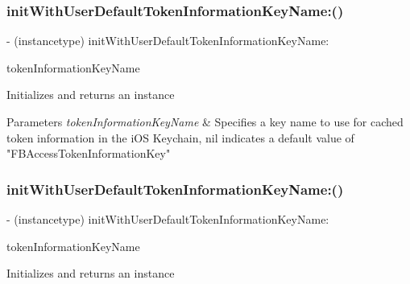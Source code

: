 \subsubsection{\texorpdfstring{init\+With\+User\+Default\+Token\+Information\+Key\+Name\+:()}{initWithUserDefaultTokenInformationKeyName:()}\hspace{0.1cm}{\footnotesize\ttfamily [3/5]}}
{\footnotesize\ttfamily -\/ (instancetype) init\+With\+User\+Default\+Token\+Information\+Key\+Name\+: \begin{DoxyParamCaption}\item[{(N\+S\+String $\ast$)}]{token\+Information\+Key\+Name }\end{DoxyParamCaption}}

Initializes and returns an instance


\begin{DoxyParams}{Parameters}
{\em token\+Information\+Key\+Name} & Specifies a key name to use for cached token information in the i\+OS Keychain, nil indicates a default value of "F\+B\+Access\+Token\+Information\+Key" \\
\hline
\end{DoxyParams}
\mbox{\label{interfaceFBSessionTokenCachingStrategy_a450317ada46fcbed38bf0edf0d0cede9}} 
\subsubsection{\texorpdfstring{init\+With\+User\+Default\+Token\+Information\+Key\+Name\+:()}{initWithUserDefaultTokenInformationKeyName:()}\hspace{0.1cm}{\footnotesize\ttfamily [4/5]}}
{\footnotesize\ttfamily -\/ (instancetype) init\+With\+User\+Default\+Token\+Information\+Key\+Name\+: \begin{DoxyParamCaption}\item[{(N\+S\+String $\ast$)}]{token\+Information\+Key\+Name }\end{DoxyParamCaption}}

Initializes and returns an instance


